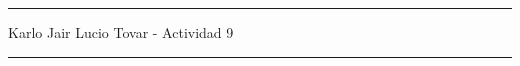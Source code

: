 \documentclass[12pt]{article}
\begin{document}
\hrule
\begin{center}
    Karlo Jair Lucio Tovar - Actividad 9\\
\end{center}
\hrule
\vspace*{.8cm}


\end{document}
